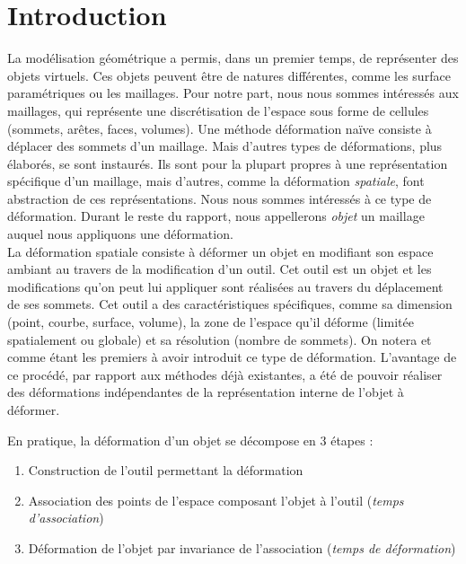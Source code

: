 
\chapter{Introduction}

\graphicspath{ {Introduction/IntroductionFigs/PNG/}
  {Introduction/IntroductionFigs/PDF/}
  {Introduction/IntroductionFigs/} }

La modélisation géométrique a permis, dans un premier temps, de représenter des
objets virtuels. Ces objets peuvent être de natures différentes, comme les
surface paramétriques ou les maillages. Pour notre part, nous nous sommes
intéressés aux maillages, qui représente une discrétisation de l'espace sous
forme de cellules (sommets, arêtes, faces, volumes). Une méthode déformation
naïve consiste à déplacer des sommets d'un maillage. Mais d'autres types de
déformations, plus élaborés, se sont instaurés. Ils sont pour la plupart propres
à une représentation spécifique d'un maillage, mais d'autres, comme la
déformation \textit{spatiale}, font abstraction de ces représentations. Nous
nous sommes intéressés à ce type de déformation. Durant le reste du rapport,
nous appellerons \textit{objet} un maillage auquel nous appliquons une
déformation.\\
	
La déformation spatiale consiste à déformer un objet en modifiant son espace
ambiant au travers de la modification d'un outil. Cet outil est un objet et les
modifications qu'on peut lui appliquer sont réalisées au travers du déplacement
de ses sommets. Cet outil a des caractéristiques spécifiques, comme sa dimension
(point, courbe, surface, volume), la zone de l'espace qu'il déforme (limitée
spatialement ou globale) et sa résolution (nombre de sommets). On notera
\cite{Bar84} et \cite{SP86} comme étant les premiers à avoir introduit ce type
de déformation. L'avantage de ce procédé, par rapport aux méthodes déjà
existantes, a été de pouvoir réaliser des déformations indépendantes de la
représentation interne de l'objet à déformer.

\newpage

En pratique, la déformation d'un objet se décompose en 3 étapes :
\begin{enumerate}  

\item Construction de l'outil permettant la déformation

\item Association des points de l'espace composant l'objet à l'outil
(\textit{temps d'association})

\item Déformation de l'objet par invariance de l'association (\textit{temps de
déformation})

\end{enumerate} 

